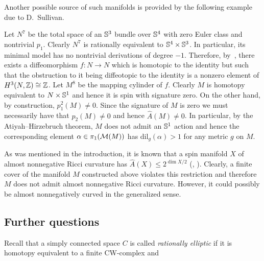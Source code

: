 \documentclass{amsart}
\begin{document}
Another possible source of such manifolds is provided by the following example due to D.~Sullivan.
\begin{ex}
Let $N^7$ be the total space of an ${\Bbb S}^3$ bundle over ${\Bbb S}^4$ with zero Euler class and nontrivial $p_1$.
Clearly $N^7$ is rationally equivalent to ${\Bbb S}^4\times {\Bbb S}^3$.
In particular, its minimal model has no nontrivial derivations of degree $-1$.
Therefore,  by~\cite[13.3]{Su}, there exists a diffeomorphism $f\colon N\to N$ which is homotopic to the identity but such that the obstruction to it being diffeotopic to the identity is a nonzero element of $H^3(N,{\Bbb Z})\cong {\Bbb Z}$.
Let $M^8$ be the mapping cylinder of $f$.
Clearly $M$ is homotopy equivalent to $N\times {\Bbb S}^{1}$ and hence it is spin with signature zero.
On the other hand, by construction, $p_1^2(M)\ne 0$.
Since the signature of $M$ is zero we must necessarily have that $p_2(M)\ne 0$  and hence $\hat{A}(M)\ne 0$.
In particular, by the Atiyah--Hirzebruch theorem, $M$ does not admit an ${\Bbb S}^{1}$ action  and hence the corresponding element $\alpha \in \pi_1({\mathcal M}(M))$ has dil$_g(\alpha)>1$ for any metric $g$ on $M$.
\end{ex}

\begin{rmk}
As was mentioned in the introduction, it is known that a spin
manifold $X$ of almost nonnegative Ricci curvature has
$\hat{A}(X)\le 2^{\dim X/2}$ (\cite[page 41]{G5}, \cite{Ga}).
Clearly, a finite cover of the manifold $M$ constructed above
violates this restriction and therefore $M$ does not admit almost
nonnegative Ricci curvature. However,  it could possibly be almost
nonnegatively curved in the generalized sense.
\end{rmk}



















\subsection{Further questions}

Recall that a simply connected space $C$ is called  {\it rationally
elliptic} if it is homotopy equivalent to a finite CW-complex and
\end{document}
